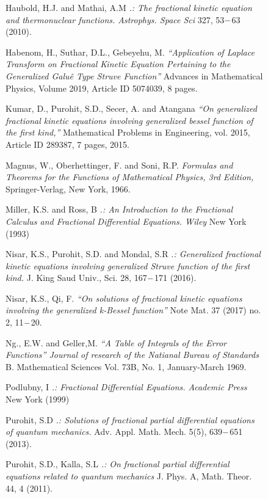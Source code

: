 \documentclass[leqno]{article}
\begin{document}
\begin{figure}[H]
\begin{thebibliography}{9}
    Haubold, H.J. and Mathai, A.M
    \textit{.: The fractional kinetic equation and thermonuclear functions. Astrophys. Space Sci}
    327, 53$\--$63 (2010).

    Habenom, H., Suthar, D.L., Gebeyehu, M.
    \textit{“Application of Laplace Transform on Fractional Kinetic Equation Pertaining to the Generalized Galu\^e Type Struve Function”}
    Advances in Mathematical Physics, Volume 2019, Article ID 5074039, 8 pages.

    Kumar, D., Purohit, S.D., Secer, A. and Atangana
    \textit{“On generalized fractional kinetic equations involving generalized bessel function of the first kind,”}
    Mathematical Problems in Engineering, vol. 2015, Article ID 289387, 7 pages, 2015.

    Magnus, W., Oberhettinger, F. and Soni, R.P.
    \textit{Formulas and Theorems for the Functions of Mathematical Physics, 3rd Edition,}
    Springer-Verlag, New York, 1966.

    Miller, K.S. and Ross, B
    \textit{.: An Introduction to the Fractional Calculus and Fractional Differential Equations. Wiley}
    New York (1993)

    Nisar, K.S., Purohit, S.D. and Mondal, S.R
    \textit{.: Generalized fractional kinetic equations involving generalized Struve function of the first kind.}
    J. King Saud Univ., Sci. 28, 167$\--$171 (2016).

    Nisar, K.S., Qi, F.
    \textit{“On solutions of fractional kinetic equations involving the generalized k-Bessel function”}
    Note Mat. 37 (2017) no. 2, 11$\--$20.

    Ng., E.W.  and Geller,M.
    \textit{“A Table of Integrals of the Error Functions” Journal  of research of the Natianal Bureau of Standards}
    B. Mathematical Sciences Vol. 73B, No. 1, January-March 1969.

    Podlubny, I
    \textit{.: Fractional Differential Equations. Academic Press}
    New York (1999)

    Purohit, S.D
    \textit{.: Solutions of fractional partial differential equations of quantum mechanics.}
    Adv. Appl. Math. Mech. 5(5), 639$\--$651 (2013).

    Purohit, S.D., Kalla, S.L
    \textit{.: On fractional partial differential equations related to quantum mechanics}
    J. Phys. A, Math. Theor. 44, 4 (2011).


\end{thebibliography}
\end{figure}
\end{document}
